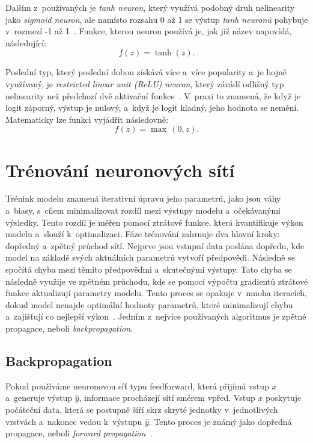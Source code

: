 Dalším z~používaných je \textit{tanh neuron}, který využívá podobný druh nelinearity jako \textit{sigmoid neuron}, ale namísto rozsahu 0 až 1 se výstup \textit{tanh neuronů} pohybuje v~rozmezí -1 až 1~\cite{dl_fundamentals}. Funkce, kterou neuron používá je, jak již název napovídá, následující: 
$$f(z) = \tanh{(z)}.$$

Poslední typ, který poslední dobou získává více a~více popularity a~je hojně využívaný, je \textit{restricted linear unit (ReLU) neuron}, který závádí odlišný typ nelinearity než předchozí dvě aktivační funkce~\cite{dl_fundamentals}. V~praxi to znamená, že když je logit záporný, výstup je nulový, a~když je logit kladný, jeho hodnota se nemění. Matematicky lze funkci vyjádřit následovně:
$$f(z) = \max\,(0,z).$$

\section{Trénování neuronových sítí}
Trénink modelu znamená iterativní úpravu jeho parametrů, jako jsou váhy a~biasy, s~cílem minimalizovat rozdíl mezi výstupy modelu a~očekávanými výsledky. Tento rozdíl je měřen pomocí ztrátové funkce, která kvantifikuje výkon modelu a~slouží k~optimalizaci. Fáze trénování zahrnuje dva hlavní kroky: dopředný a~zpětný průchod sítí. Nejprve jsou vstupní data poslána dopředu, kde model na základě svých aktuálních parametrů vytvoří předpovědi. Následně se spočítá chyba mezi těmito předpověďmi a~skutečnými výstupy. Tato chyba se následně využije ve zpětném průchodu, kde se pomocí výpočtu gradientů ztrátové funkce aktualizují parametry modelu. Tento proces se opakuje v~mnoha iteracích, dokud model nenajde optimální hodnoty parametrů, které minimalizují chybu a~zajišťují co nejlepší výkon~\cite{dl_fundamentals}. Jedním z~nejvíce používaných algoritmus je zpětné propagace, neboli \textit{backpropagation}.

\subsection{Backpropagation}
Pokud používáme neuronovou síť typu feedforward, která přijímá vstup $x$ a~generuje výstup $\hat{y}$, informace procházejí sítí směrem vpřed. Vstup $x$ poskytuje počáteční data, která se postupně šíří skrz skryté jednotky v~jednotlivých vrstvách a~nakonec vedou k~výstupu $\hat{y}$. Tento proces je známý jako dopředná propagace, neboli \textit{forward propagation}~\cite{Goodfellow-et-al-2016}.

